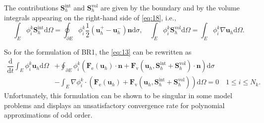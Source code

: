 \documentclass{develop-note}
\begin{document}
The contributions $\mathbf{S}_{h}^{\mathrm{int}}$ and $\mathbf{S}_{h}^{\mathrm{vol}}$ are given by the boundary and by the volume integrals appearing on the right-hand side of \autoref{eq:18}, i.e.,
\begin{equation}
  \int_{E}\phi_{i}^{k}\mathbf{S}_{h}^{\mathrm{int}}\mathrm{d}\Omega=\oint_{\partial E}\phi_{i}^{k}\dfrac{1}{2}(\mathbf{u}_{h}^{+}-\mathbf{u}_{h}^{-})\mathbf{n}\mathrm{d}\sigma,\quad \int_{E}\phi_{i}^{k}\mathbf{S}_{h}^{\mathrm{vol}}\mathrm{d}\Omega=\int_{E}\phi_{i}^{k}\nabla\mathbf{u}_{h}\mathrm{d}\Omega.
\end{equation}

So for the formulation of BR1, the \autoref{eq:13} can be rewritten as
\begin{equation}
  \label{eq:20}
  \begin{aligned}
    \dfrac{\mathrm{d}}{\mathrm{d}t}\int_{E}\phi_{i}^{k}\mathbf{u}_{h}\mathrm{d}\Omega &+\oint_{\partial E}\phi_{i}^{k}(\mathbf{F}_{\mathrm{e}}(\mathbf{u}_{h})\cdot\mathbf{n}+\mathbf{F}_{\mathrm{v}}(\mathbf{u}_{h},\mathbf{S}_{h}^{\mathrm{int}}+\mathbf{S}_{h}^{\mathrm{vol}})\cdot\mathbf{n})\mathrm{d}\sigma\\
    &-\int_{E}\nabla\phi_{i}^{k}\cdot(\mathbf{F}_{\mathrm{e}}(\mathbf{u}_{h})+\mathbf{F}_{\mathrm{v}}(\mathbf{u}_{h},\mathbf{S}_{h}^{\mathrm{int}}+\mathbf{S}_{h}^{\mathrm{vol}}))\mathrm{d}\Omega=0\quad 1\leqslant i\leqslant N_{k}.
  \end{aligned}
\end{equation}
Unfortunately, this formulation can be shown to be singular in some model problems and displays an unsatisfactory convergence rate for polynomial approximations of odd order.
\end{document}
